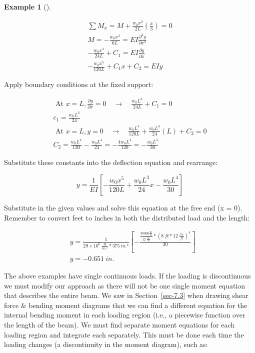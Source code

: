 \documentclass[
  letterpaper,
  DIV=11,
  numbers=noendperiod]{scrreprt}
\theoremstyle{definition}
\newtheorem{example}{Example}[chapter]
\theoremstyle{remark}
\begin{document}
\begin{tcolorbox}
\begin{example}[]
\begin{tcolorbox}
\[
\begin{gathered} \sum M_x=M+\frac{w_0 x^2}{2 L}\left(\frac{x}{3}\right)=0 \\ M=-\frac{w_0 x^3}{6 L}=E I \frac{\partial^2 y}{\partial x^2} \\ -\frac{w_0 x^4}{24 L}+C_1=E I \frac{\partial y}{\partial x} \\ -\frac{w_0 x^5}{120 L}+C_1 x+C_2=EIy\end{gathered}
\]

Apply boundary conditions at the fixed support:

\[
\begin{gathered} \text { At } x=L, \frac{\partial y}{\partial x}=0 \quad \rightarrow \quad \frac{w_0 L^4}{24 L}+C_1=0
\\ c_1=\frac{w_0 L^3}{24}
\\ \text { At } x=L, y=0 \quad \rightarrow \quad \frac{w_0 L^5}{120 L}+\frac{w_0 L^3}{24}(L)+C_2=0
\\ C_2=\frac{w_0 L^4}{120}-\frac{w_0 L^4}{24}=-\frac{4 w_0 L^4}{120}=-\frac{w_0 L^4}{30} \end{gathered}
\]

Substitute these constants into the deflection equation and rearrange:

\[
y=\frac{1}{E I}\left[-\frac{w_0 x^5}{120L}+\frac{w_0 L^3}{24} x-\frac{w_0 L^4}{30}\right]
\]

Substitute in the given values and solve this equation at the free end
(x = 0). Remember to convert feet to inches in both the distributed load
and the length:

\[
\begin{aligned}
& y=\frac{1}{29 \times 10^6~\frac{lb}{in.^2}*375{~in.^4}} \left[-\frac{\frac{30000\frac{lb}{ft}}{12~\frac{in.}{ft}}*(8{~ft}*12~\frac{in.}{ft})^4}{30}\right] \\
& y=- 0.651{~in.}\end{aligned}
\]

\end{tcolorbox}

\end{example}

\end{tcolorbox}

The above examples have single continuous loads. If the loading is
discontinuous we must modify our approach as there will not be one
single moment equation that describes the entire beam. We saw in
Section~\ref{sec-7.3} when drawing shear force \& bending moment
diagrams that we can find a different equation for the internal bending
moment in each loading region (i.e., a piecewise function over the
length of the beam). We must find separate moment equations for each
loading region and integrate each separately. This must be done each
time the loading changes (a discontinuity in the moment diagram), such
as:
\end{document}
